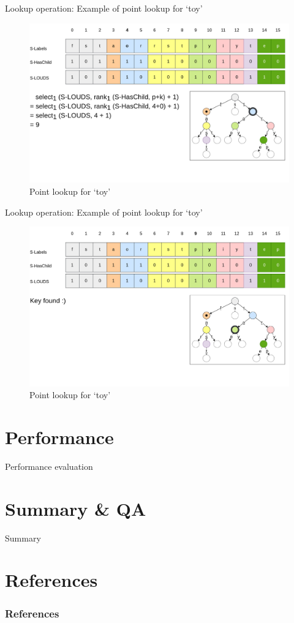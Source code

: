 \documentclass{beamer}
\begin{document}
\begin{frame}{Lookup operation: Example of point lookup for `toy'}
		\begin{figure}
				\centering
				\includegraphics[width=\textwidth]{resources/surf_point_lookup_2}
				\caption{Point lookup for `toy'}
		\end{figure}
\end{frame}

\begin{frame}{Lookup operation: Example of point lookup for `toy'}
		\begin{figure}
				\centering
				\includegraphics[width=\textwidth]{resources/surf_point_lookup_3}
				\caption{Point lookup for `toy'}
		\end{figure}
\end{frame}

\section{Performance}


\begin{frame}{Performance evaluation}
\end{frame}

\section{Summary \& QA}

\begin{frame}{Summary}
\end{frame}

\section{References}

\begin{frame}[allowframebreaks]
		\frametitle{References}
		\printbibliography
\end{frame}
\end{document}
